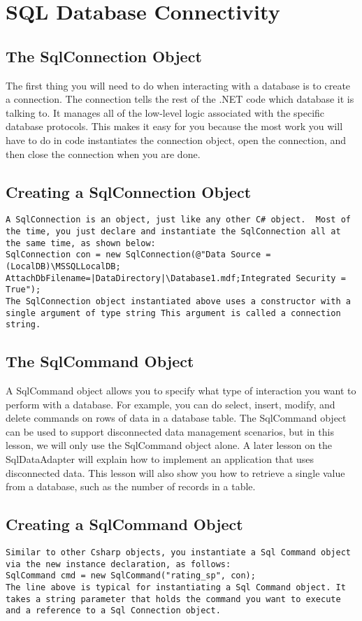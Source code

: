 \chapter{SQL Database Connectivity}
\section{The SqlConnection Object}
The first thing you will need to do when interacting with a database is to create a connection. The connection tells the rest of the .NET code which database it is talking to. It manages all of the low-level logic associated with the specific database protocols. This makes it easy for you because the most work you will have to do in code instantiates the connection object, open the connection, and then close the connection when you are done. 
\section{Creating a SqlConnection Object}
\begin{lstlisting}
A SqlConnection is an object, just like any other C# object.  Most of the time, you just declare and instantiate the SqlConnection all at the same time, as shown below:
SqlConnection con = new SqlConnection(@"Data Source = (LocalDB)\MSSQLLocalDB; AttachDbFilename=|DataDirectory|\Database1.mdf;Integrated Security = True");
The SqlConnection object instantiated above uses a constructor with a single argument of type string This argument is called a connection string.
\end{lstlisting} 
\section{The SqlCommand Object}
A SqlCommand object allows you to specify what type of interaction you want to perform with a database. For example, you can do select, insert, modify, and delete commands on rows of data in a database table. The SqlCommand object can be used to support disconnected data management scenarios, but in this lesson, we will only use the SqlCommand object alone. A later lesson on the SqlDataAdapter will explain how to implement an application that uses disconnected data. This lesson will also show you how to retrieve a single value from a database, such as the number of records in a table. 
\section{Creating a SqlCommand Object}
\begin{lstlisting}
Similar to other Csharp objects, you instantiate a Sql Command object via the new instance declaration, as follows:
SqlCommand cmd = new SqlCommand("rating_sp", con);  
The line above is typical for instantiating a Sql Command object. It takes a string parameter that holds the command you want to execute and a reference to a Sql Connection object.
\end{lstlisting}


